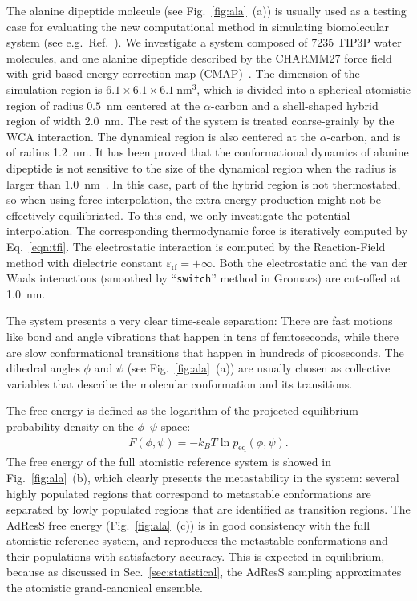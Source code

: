 \documentclass[epjST]{svjour}
\newcommand{\equi}{{\textrm{eq}}}
\begin{document}
The alanine dipeptide molecule (see Fig.~\ref{fig:ala}~(a)) is usually
used as a testing case for evaluating the new computational method in simulating 
biomolecular system (see e.g.~Ref.~\cite{apostolakis1999calculation,chodera2007automatic,kaminsky2007force,gfeller2007complex}).
We investigate a system composed of
7235 TIP3P water molecules, and
one alanine dipeptide described by the CHARMM27 force field~\cite{foloppe2000all} with
grid-based energy correction map (CMAP)~\cite{mackerell2004extending}. 
The dimension of the simulation region is $6.1\times6.1\times6.1~\textrm{nm}^3$, which is divided into
a spherical atomistic region of radius  $0.5$~nm centered at the $\alpha$-carbon and a  shell-shaped hybrid region of width 2.0~nm.
The rest of the system is treated coarse-grainly by the WCA interaction.
The dynamical region  is
also centered at the $\alpha$-carbon, and is of radius 1.2~nm.
It has been proved that the conformational dynamics of alanine dipeptide is not sensitive to the size of
the dynamical region when the radius is larger than 1.0~nm~\cite{wang2014exploring}.
In this case, part of the hybrid region is not thermostated, so
when using force interpolation, the extra energy production might not be effectively equilibriated.
To this end, we only investigate the potential interpolation. The corresponding
thermodynamic force is iteratively computed by
Eq.~\eqref{eqn:tfi}.
The electrostatic interaction is computed by the Reaction-Field method with dielectric constant $\varepsilon_{\textrm{rf}} = +\infty$.
Both the electrostatic and the van der Waals interactions (smoothed by ``\texttt{switch}'' method in Gromacs)
are cut-offed at 1.0~nm.

The system presents a very clear time-scale separation: There are fast
motions like bond and angle vibrations that happen in tens of femtoseconds, while
there are slow conformational transitions that happen in hundreds of picoseconds.
The dihedral angles $\phi$ and $\psi$ (see
Fig.~\ref{fig:ala}~(a)) are usually chosen as collective variables that  describe
the molecular conformation and its transitions.

The free energy is defined as the logarithm of the projected equilibrium probability density on the
$\phi$--$\psi$ space:
\begin{align}
  F(\phi,\psi) = -k_BT \ln p_\equi(\phi,\psi).
\end{align}
The free energy of the full atomistic reference system is showed in
Fig.~\ref{fig:ala}~(b), which clearly presents the metastability in the
system: several highly populated regions that correspond to metastable
conformations are separated by lowly populated regions that are
identified as transition regions.
The AdResS free energy (Fig.~\ref{fig:ala}~(c)) is in good
consistency with the full atomistic reference system, and
reproduces the metastable conformations and their populations
with satisfactory accuracy.
This is expected in equilibrium, because as discussed in
Sec.~\ref{sec:statistical}, the AdResS sampling approximates the
atomistic grand-canonical ensemble.
\end{document}
